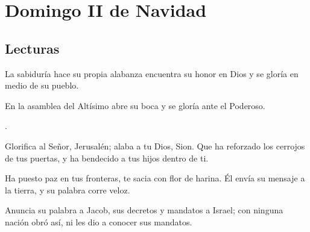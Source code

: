 \chapter{Domingo II de Navidad}

\section{Lecturas}


 


\begin{scripture}
	\begin{readprose}
		La sabiduría hace su propia alabanza	
		encuentra su honor en Dios	
		y se gloría en medio de su pueblo.
		
		En la asamblea del Altísimo	
		abre su boca y se gloría ante el Poderoso.
		
		.
	\end{readprose}
\end{scripture}


 


\begin{psbody}
	Glorifica al Señor, Jerusalén;
	alaba a tu Dios, Sion.
	Que ha reforzado los cerrojos de tus puertas,
	y ha bendecido a tus hijos dentro de ti.
	
	Ha puesto paz en tus fronteras,
	te sacia con flor de harina.
	Él envía su mensaje a la tierra,
	y su palabra corre veloz.
	
	Anuncia su palabra a Jacob,
	sus decretos y mandatos a Israel;
	con ninguna nación obró así,
	ni les dio a conocer sus mandatos.
\end{psbody}


